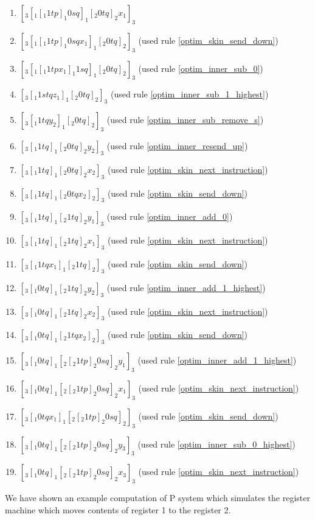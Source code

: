 \documentclass[submission,copyright,creativecommons]{../lib/lncs/llncs}
\begin{document}
\begin{example}
  \begin{enumerate}
    \item $[_3 [_1 [_1 1 t p ]_1 0 s q ]_1 [_2 0 t q ]_2 x_1 ]_3$
    \item $[_3 [_1 [_1 1 t p ]_1 0 s q x_1 ]_1 [_2 0 t q ]_2 ]_3$ (used rule \ref{optim_skin_send_down})
    \item $[_3 [_1 [_1 1 t p x_1 ]_1 1 s q ]_1 [_2 0 t q ]_2 ]_3$ (used rule \ref{optim_inner_sub_0})
    \item $[_3 [_1 1 s t q z_1 ]_1 [_2 0 t q ]_2 ]_3$ (used rule \ref{optim_inner_sub_1_highest})
    \item $[_3 [_1 1 t q y_2 ]_1 [_2 0 t q ]_2 ]_3$ (used rule \ref{optim_inner_sub_remove_s})
    \item $[_3 [_1 1 t q ]_1 [_2 0 t q ]_2 y_2 ]_3$ (used rule \ref{optim_inner_resend_up})
    \item $[_3 [_1 1 t q ]_1 [_2 0 t q ]_2 x_2 ]_3$ (used rule \ref{optim_skin_next_instruction})
    \item $[_3 [_1 1 t q ]_1 [_2 0 t q x_2 ]_2 ]_3$ (used rule \ref{optim_skin_send_down})
    \item $[_3 [_1 1 t q ]_1 [_2 1 t q ]_2 y_1 ]_3$ (used rule \ref{optim_inner_add_0})
    \item $[_3 [_1 1 t q ]_1 [_2 1 t q ]_2 x_1 ]_3$ (used rule \ref{optim_skin_next_instruction})
    \item $[_3 [_1 1 t q x_1 ]_1 [_2 1 t q ]_2 ]_3$ (used rule \ref{optim_skin_send_down})
    \item $[_3 [_1 0 t q ]_1 [_2 1 t q ]_2 y_2 ]_3$ (used rule \ref{optim_inner_add_1_highest})
    \item $[_3 [_1 0 t q ]_1 [_2 1 t q ]_2 x_2 ]_3$ (used rule \ref{optim_skin_next_instruction})
    \item $[_3 [_1 0 t q ]_1 [_2 1 t q x_2 ]_2 ]_3$ (used rule \ref{optim_skin_send_down})
    \item $[_3 [_1 0 t q ]_1 [_2 [_2 1 t p ]_2 0 s q ]_2 y_1 ]_3$ (used rule \ref{optim_inner_add_1_highest})
    \item $[_3 [_1 0 t q ]_1 [_2 [_2 1 t p ]_2 0 s q ]_2 x_1 ]_3$ (used rule \ref{optim_skin_next_instruction})
    \item $[_3 [_1 0 t q x_1 ]_1 [_2 [_2 1 t p ]_2 0 s q ]_2 ]_3$ (used rule \ref{optim_skin_send_down})
    \item $[_3 [_1 0 t q ]_1 [_2 [_2 1 t p ]_2 0 s q ]_2 y_3 ]_3$ (used rule \ref{optim_inner_sub_0_highest})
    \item $[_3 [_1 0 t q ]_1 [_2 [_2 1 t p ]_2 0 s q ]_2 x_3 ]_3$ (used rule \ref{optim_skin_next_instruction})
  \end{enumerate}

  We have shown an example computation of P system which simulates the register machine which moves contents of register 1 to the register 2.
\end{example}
\end{document}
